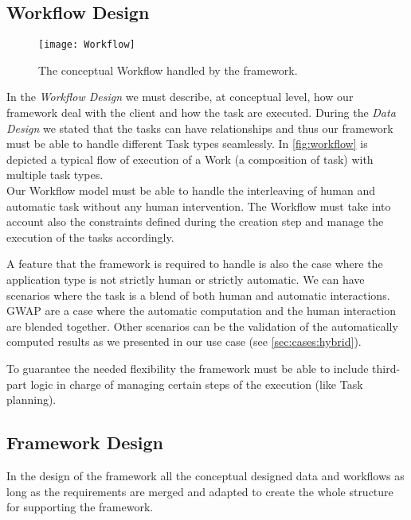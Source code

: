 \subsection{Workflow Design}
\begin{figure}[htb]
    \centering
    \texttt{[image: Workflow]}
    \caption{The conceptual Workflow handled by the framework.}
    \label{fig:workflow}
\end{figure}
% 
In the \emph{Workflow Design} we must describe, at conceptual level, how our
framework deal with the client and how the task are executed. During the
\emph{Data Design} we stated that the tasks can have relationships and thus our
framework must be able to handle different Task types seamlessly. In
\autoref{fig:workflow} is depicted a typical flow of execution of a Work (a
composition of task) with multiple task types.\\

Our Workflow model must be able to handle the interleaving of human and automatic
task without any human intervention. The Workflow must take into account also the
constraints defined during the creation step and manage the execution of the
tasks accordingly.

A feature that the framework is required to handle is also the case where
the application type is not strictly human or strictly automatic. We can have
scenarios where the task is a blend of both human and automatic interactions.
\ac{GWAP} are a case where the automatic computation and the human interaction
are blended together. Other scenarios can be the validation of the automatically
computed results as we presented in our use case (see \ref{sec:cases:hybrid}).

To guarantee the needed flexibility the framework must be able to include third-part
logic in charge of managing certain steps of the execution (like Task planning).




\subsection{Framework Design}
In the design of the framework all the conceptual designed data and workflows as
long as the requirements are merged and adapted to create the whole structure for
supporting the framework.\\

